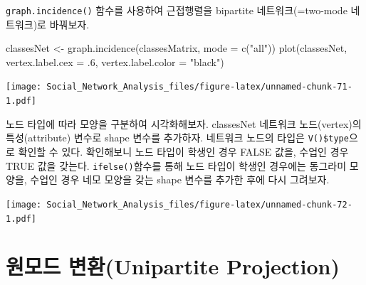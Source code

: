 \documentclass[
]{book}
\newenvironment{Shaded}{\begin{snugshade}}{\end{snugshade}}
\newcommand{\AttributeTok}[1]{\textcolor[rgb]{0.77,0.63,0.00}{#1}}
\newcommand{\ConstantTok}[1]{\textcolor[rgb]{0.00,0.00,0.00}{#1}}
\newcommand{\DecValTok}[1]{\textcolor[rgb]{0.00,0.00,0.81}{#1}}
\newcommand{\FunctionTok}[1]{\textcolor[rgb]{0.00,0.00,0.00}{#1}}
\newcommand{\NormalTok}[1]{#1}
\newcommand{\OtherTok}[1]{\textcolor[rgb]{0.56,0.35,0.01}{#1}}
\newcommand{\SpecialCharTok}[1]{\textcolor[rgb]{0.00,0.00,0.00}{#1}}
\newcommand{\StringTok}[1]{\textcolor[rgb]{0.31,0.60,0.02}{#1}}
\begin{document}
\texttt{graph.incidence()} 함수를 사용하여 근접행렬을 bipartite 네트워크(=two-mode 네트워크)로 바꿔보자.

\begin{Shaded}
\begin{Highlighting}[]
\NormalTok{classesNet }\OtherTok{\textless{}{-}} \FunctionTok{graph.incidence}\NormalTok{(classesMatrix, }\AttributeTok{mode =} \FunctionTok{c}\NormalTok{(}\StringTok{"all"}\NormalTok{))}
\FunctionTok{plot}\NormalTok{(classesNet, }\AttributeTok{vertex.label.cex =}\NormalTok{ .}\DecValTok{6}\NormalTok{, }\AttributeTok{vertex.label.color =} \StringTok{"black"}\NormalTok{)}
\end{Highlighting}
\end{Shaded}

\texttt{[image: Social\_Network\_Analysis\_files/figure-latex/unnamed-chunk-71-1.pdf]}

노드 타입에 따라 모양을 구분하여 시각화해보자. classesNet 네트워크 노드(vertex)의 특성(attribute) 변수로 shape 변수를 추가하자. 네트워크 노드의 타입은 \texttt{V()\$type}으로 확인할 수 있다. 확인해보니 노드 타입이 학생인 경우 FALSE 값을, 수업인 경우 TRUE 값을 갖는다. \texttt{ifelse()}함수를 통해 노드 타입이 학생인 경우에는 동그라미 모양을, 수업인 경우 네모 모양을 갖는 shape 변수를 추가한 후에 다시 그려보자.

\begin{Shaded}
\end{Shaded}

\texttt{[image: Social\_Network\_Analysis\_files/figure-latex/unnamed-chunk-72-1.pdf]}

\hypertarget{uxc6d0uxbaa8uxb4dc-uxbcc0uxd658unipartite-projection}{%
\section{원모드 변환(Unipartite Projection)}\label{uxc6d0uxbaa8uxb4dc-uxbcc0uxd658unipartite-projection}}
\end{document}
